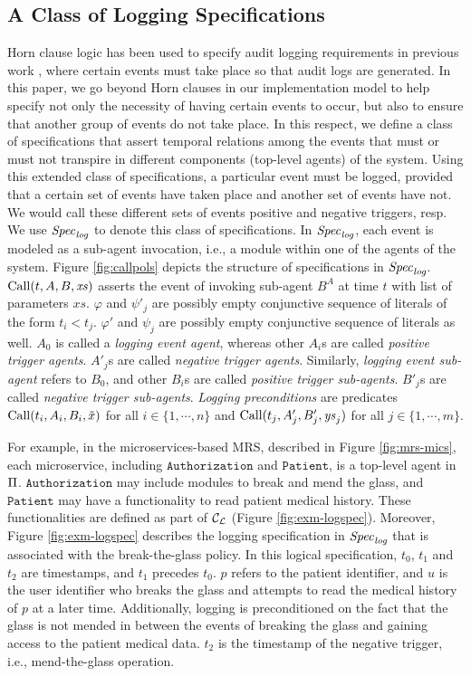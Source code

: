 \subsection{A Class of Logging Specifications} \label{sec:logspec}
Horn clause logic has been used to specify audit logging requirements in previous work \cite{stpsa21}, where certain events must take place so that audit logs are generated. In this paper, we go beyond Horn clauses in our implementation model to help specify not only the necessity of having certain events to occur, but also to ensure that another group of events do not take place. In this respect, we define a class of specifications that assert temporal relations among the events that must or must not transpire in different components (top-level agents) of the system. Using this extended class of specifications, a particular event must be logged, provided that a certain set of events have taken place and another set of events have not. We would call these different sets of events positive and negative triggers, resp. We use ${\mathit{Spec}_{\mathit{log}}}$ to denote this class of specifications. In ${\mathit{Spec}_{\mathit{log}}}$, each event is modeled as a sub-agent invocation, i.e., a module within one of the agents of the system. Figure \ref{fig:callpols} depicts the structure of specifications in ${\mathit{Spec}_{\mathit{log}}}$. $\mathrm{Call}(t,A,B,\mathit{xs})$ asserts the event of invoking sub-agent $B^A$ at time $t$ with list of parameters $\mathit{xs}$. $\varphi$ and $\psi'_j$ are possibly empty conjunctive sequence of literals of the form $t_i < t_j$. $\varphi'$ and $\psi_j$ are possibly empty conjunctive sequence of literals as well. $A_0$ is called a \emph{logging event agent}, whereas other $A_i$s are called \emph{positive trigger agents}. $A'_j$s are called \emph{negative trigger agents}. Similarly, \emph{logging event sub-agent} refers to $B_0$, and other $B_i$s are called \emph{positive trigger sub-agents}. $B'_j$s are called \emph{negative trigger sub-agents}. \emph{Logging preconditions} are predicates $\mathrm{Call}(t_i,A_i,B_i,\tilde{x})$ for all $i \in \{1,\cdots, n\}$ and $\mathrm{Call}(t_j , A'_j , B'_j , \mathit{ys}_j )$ for all $j \in \{1, \cdots, m\}$. 

For example, in the microservices-based MRS, described in Figure \ref{fig:mrs-mics}, each microservice, including $\mathtt{Authorization}$ and $\mathtt{Patient}$, is a top-level agent in $\Pi$. $\mathtt{Authorization}$ may include modules to break and mend the glass, and $\mathtt{Patient}$ may have a functionality to read patient medical history. These functionalities are defined as part of $\mathcal{C}_\mathcal{L}$ (Figure \ref{fig:exm-logspec}). Moreover, Figure \ref{fig:exm-logspec} describes the logging specification in ${\mathit{Spec}_{\mathit{log}}}$ that is associated with the break-the-glass policy. In this logical specification, $t_0$, $t_1$ and $t_2$ are timestamps, and $t_1$ precedes $t_0$.  $p$ refers to the patient identifier, and $u$ is the user identifier who breaks the glass and attempts to read the medical history of $p$ at a later time. Additionally, logging is preconditioned on the fact that the glass is not mended in between the events of breaking the glass and gaining access to the patient medical data. $t_2$ is the timestamp of the negative trigger, i.e., mend-the-glass operation.


